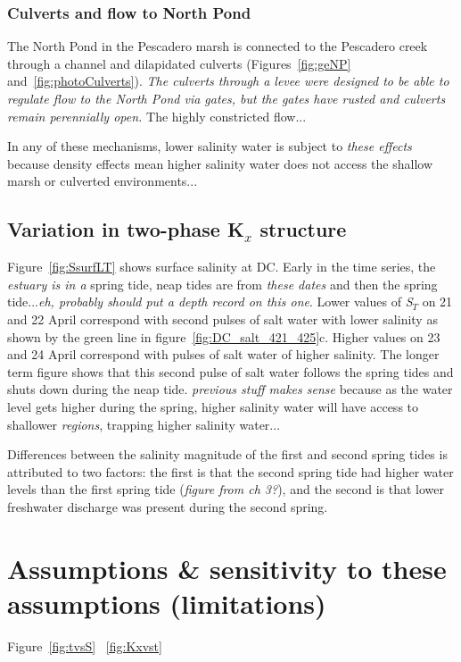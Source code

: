 \subsubsection{Culverts and flow to North Pond}
The North Pond in the Pescadero marsh is connected to the Pescadero creek through a channel and dilapidated culverts (Figures~\ref{fig:geNP} and~\ref{fig:photoCulverts}). \emph{The culverts through a levee were designed to be able to regulate flow to the North Pond via gates, but the gates have rusted and culverts remain perennially open.} The highly constricted flow... 

In any of these mechanisms, lower salinity water is subject to \emph{these effects} because density effects mean higher salinity water does not access the shallow marsh or culverted environments... 

\subsection{Variation in two-phase K$_x$ structure}
Figure~\ref{fig:SsurfLT} shows surface salinity at DC. Early in the time series, the \emph{estuary is in a} spring tide, neap tides are from \emph{these dates} and then the spring tide...\emph{eh, probably should put a depth record on this one}. Lower values of \emph{S$_T$} on 21 and 22 April correspond with second pulses of salt water with lower salinity as shown by the green line in figure~\ref{fig:DC_salt_421_425}c. Higher values on 23 and 24 April correspond with pulses of salt water of higher salinity. The longer term figure shows that this second pulse of salt water follows the spring tides and shuts down during the neap tide. \emph{previous stuff makes sense} because as the water level gets higher during the spring, higher salinity water will have access to shallower \emph{regions}, trapping higher salinity water... 

Differences between the salinity magnitude of the first and second spring tides is attributed to two factors: the first is that the second spring tide had higher water levels than the first spring tide (\emph{figure from ch 3?}), and the second is that lower freshwater discharge was present during the second spring. 

\section{Assumptions \& sensitivity to these assumptions (limitations)}

Figure~\ref{fig:tvsS} ~\ref{fig:Kxvst}

